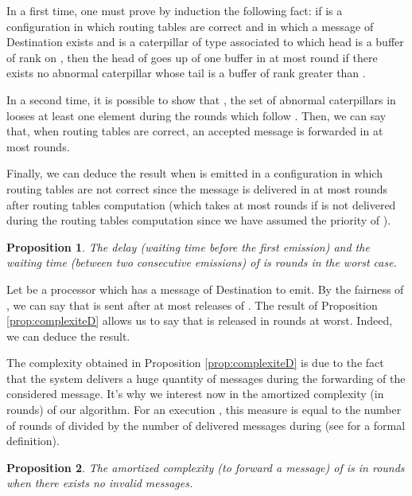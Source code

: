\documentclass[11pt]{article}
\newtheorem{proposition}{Proposition}
\newenvironment{sketchproof}{{\noindent\bf Sketch of proof. } }{{\hfill }}
\begin{document}
\begin{sketchproof}
In a first time, one must prove by induction the following fact: if  is a configuration in which routing tables are correct and in which a message of Destination  exists and  is a caterpillar of type  associated to  which head is a buffer of rank  on , then the head of  goes up of one buffer in at most  round if there exists no abnormal caterpillar whose tail is a buffer of rank greater than .

In a second time, it is possible to show that , the set of abnormal caterpillars in  looses at least one element during the  rounds which follow . Then, we can say that, when routing tables are correct, an accepted message is forwarded in at most  rounds.

Finally, we can deduce the result when  is emitted in a configuration in which routing tables are not correct since the message is delivered in at most  rounds after routing tables computation (which takes at most  rounds if  is not delivered during the routing tables computation since we have assumed the priority of ).
\end{sketchproof}

\begin{proposition} \label{prop:delaiD}
The delay (waiting time before the first emission) and the waiting time (between two consecutive emissions) of \AD is  rounds in the worst case.
\end{proposition}

\begin{sketchproof}
Let  be a processor which has a message of Destination  to emit. By the fairness of , we can say that  is sent after at most  releases of . The result of Proposition \ref{prop:complexiteD} allows us to say that  is released in  rounds at worst. Indeed, we can deduce the result.
\end{sketchproof}

The complexity obtained in Proposition \ref{prop:complexiteD} is due to the fact that the system delivers a huge quantity of messages during the forwarding of the considered message. It's why we interest now in the amortized complexity (in rounds) of our algorithm. For an execution , this measure is equal to the number of rounds of  divided by the number of delivered messages during  (see \cite{CLRS02} for a formal definition).

\begin{proposition} \label{prop:amortieD}
The amortized complexity (to forward a message) of \AD is in   rounds when there exists no invalid messages.
\end{proposition}
\end{document}
